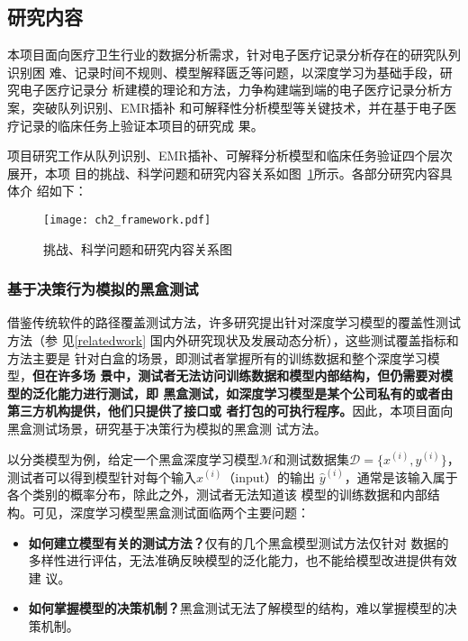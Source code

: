 \subsection{研究内容}\label{ch2content}

本项目面向医疗卫生行业的数据分析需求，针对电子医疗记录分析存在的研究队列识别困
难、记录时间不规则、模型解释匮乏等问题，以深度学习为基础手段，研究电子医疗记录分
析建模的理论和方法，力争构建端到端的电子医疗记录分析方案，突破队列识别、EMR插补
和可解释性分析模型等关键技术，并在基于电子医疗记录的临床任务上验证本项目的研究成
果。

项目研究工作从队列识别、EMR插补、可解释分析模型和临床任务验证四个层次展开，本项
目的挑战、科学问题和研究内容关系如图~\ref{fig:ch2:rc}所示。各部分研究内容具体介
绍如下：

\begin{figure}
    \begin{small}
        \begin{center}
            \texttt{[image: ch2\_framework.pdf]}
        \end{center}
        \caption{挑战、科学问题和研究内容关系图}
        \label{fig:ch2:rc}
    \end{small}
\end{figure}

\subsubsection{基于决策行为模拟的黑盒测试}

借鉴传统软件的路径覆盖测试方法，许多研究提出针对深度学习模型的覆盖性测试方法（参
见\ref{relatedwork} 国内外研究现状及发展动态分析），这些测试覆盖指标和方法主要是
针对白盒的场景，即测试者掌握所有的训练数据和整个深度学习模型，\textbf{但在许多场
景中，测试者无法访问训练数据和模型内部结构，但仍需要对模型的泛化能力进行测试，即
黑盒测试，如深度学习模型是某个公司私有的或者由第三方机构提供，他们只提供了接口或
者打包的可执行程序。}因此，本项目面向黑盒测试场景，研究基于决策行为模拟的黑盒测
试方法。

以分类模型为例，给定一个黑盒深度学习模型$\mathcal M$和测试数据集$\mathcal
D=\{x^{(i)},y^{(i)}\}$，测试者可以得到模型针对每个输入$x^{(i)}$（input）的输出
$\hat{y}^{(i)}$，通常是该输入属于各个类别的概率分布，除此之外，测试者无法知道该
模型的训练数据和内部结构。可见，深度学习模型黑盒测试面临两个主要问题：
\begin{itemize}
    \item \textbf{如何建立模型有关的测试方法？}仅有的几个黑盒模型测试方法仅针对
    数据的多样性进行评估，无法准确反映模型的泛化能力，也不能给模型改进提供有效建
    议。
    \item \textbf{如何掌握模型的决策机制？}黑盒测试无法了解模型的结构，难以掌握模型的决策机制。
\end{itemize}

